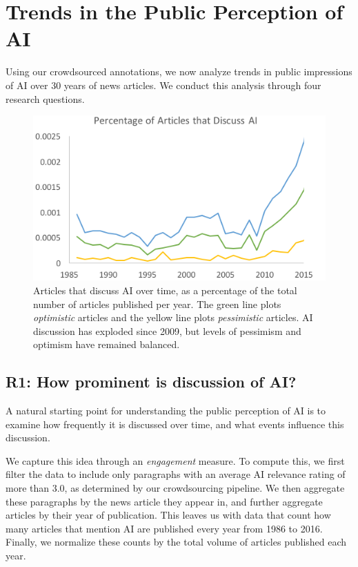 \documentclass[letterpaper]{article}
\begin{document}
\section{Trends in the Public Perception of AI}

Using our crowdsourced annotations, we now analyze trends in public impressions of AI over 30 years of news articles. We conduct this analysis through four research questions.

\begin{figure}[!t]
\centering
\includegraphics[width=1.0\columnwidth]{ai-over-time2}
\caption{Articles that discuss AI over time, as a percentage of the total number of articles published per year. The green line plots \textit{optimistic} articles and the yellow line plots \textit{pessimistic} articles. AI discussion has exploded since 2009, but levels of pessimism and optimism have remained balanced.}
\label{fig:general}
\end{figure}

\subsection{R1: How prominent is discussion of AI?}

A natural starting point for understanding the public perception of AI is to examine how frequently it is discussed over time, and what events influence this discussion. 

We capture this idea through an \textit{engagement} measure. To compute this, we first filter the data to include only paragraphs with an average AI relevance rating of more than 3.0, as determined by our crowdsourcing pipeline. We then aggregate these paragraphs by the news article they appear in, and further aggregate articles by their year of publication. This leaves us with data that count how many articles that mention AI are published every year from 1986 to 2016. Finally, we normalize these counts by the total volume of articles published each year. %
\end{document}
